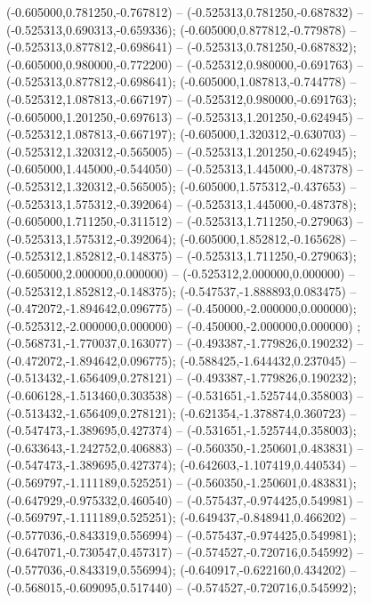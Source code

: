  (-0.605000,0.781250,-0.767812) -- (-0.525313,0.781250,-0.687832) -- (-0.525313,0.690313,-0.659336);
 (-0.605000,0.877812,-0.779878) -- (-0.525313,0.877812,-0.698641) -- (-0.525313,0.781250,-0.687832);
 (-0.605000,0.980000,-0.772200) -- (-0.525312,0.980000,-0.691763) -- (-0.525313,0.877812,-0.698641);
 (-0.605000,1.087813,-0.744778) -- (-0.525312,1.087813,-0.667197) -- (-0.525312,0.980000,-0.691763);
 (-0.605000,1.201250,-0.697613) -- (-0.525313,1.201250,-0.624945) -- (-0.525312,1.087813,-0.667197);
 (-0.605000,1.320312,-0.630703) -- (-0.525312,1.320312,-0.565005) -- (-0.525313,1.201250,-0.624945);
 (-0.605000,1.445000,-0.544050) -- (-0.525313,1.445000,-0.487378) -- (-0.525312,1.320312,-0.565005);
 (-0.605000,1.575312,-0.437653) -- (-0.525313,1.575312,-0.392064) -- (-0.525313,1.445000,-0.487378);
 (-0.605000,1.711250,-0.311512) -- (-0.525313,1.711250,-0.279063) -- (-0.525313,1.575312,-0.392064);
 (-0.605000,1.852812,-0.165628) -- (-0.525312,1.852812,-0.148375) -- (-0.525313,1.711250,-0.279063);
 (-0.605000,2.000000,0.000000) -- (-0.525312,2.000000,0.000000) -- (-0.525312,1.852812,-0.148375);
 (-0.547537,-1.888893,0.083475) -- (-0.472072,-1.894642,0.096775) -- (-0.450000,-2.000000,0.000000);
 (-0.525312,-2.000000,0.000000) -- (-0.450000,-2.000000,0.000000) ;
 (-0.568731,-1.770037,0.163077) -- (-0.493387,-1.779826,0.190232) -- (-0.472072,-1.894642,0.096775);
 (-0.588425,-1.644432,0.237045) -- (-0.513432,-1.656409,0.278121) -- (-0.493387,-1.779826,0.190232);
 (-0.606128,-1.513460,0.303538) -- (-0.531651,-1.525744,0.358003) -- (-0.513432,-1.656409,0.278121);
 (-0.621354,-1.378874,0.360723) -- (-0.547473,-1.389695,0.427374) -- (-0.531651,-1.525744,0.358003);
 (-0.633643,-1.242752,0.406883) -- (-0.560350,-1.250601,0.483831) -- (-0.547473,-1.389695,0.427374);
 (-0.642603,-1.107419,0.440534) -- (-0.569797,-1.111189,0.525251) -- (-0.560350,-1.250601,0.483831);
 (-0.647929,-0.975332,0.460540) -- (-0.575437,-0.974425,0.549981) -- (-0.569797,-1.111189,0.525251);
 (-0.649437,-0.848941,0.466202) -- (-0.577036,-0.843319,0.556994) -- (-0.575437,-0.974425,0.549981);
 (-0.647071,-0.730547,0.457317) -- (-0.574527,-0.720716,0.545992) -- (-0.577036,-0.843319,0.556994);
 (-0.640917,-0.622160,0.434202) -- (-0.568015,-0.609095,0.517440) -- (-0.574527,-0.720716,0.545992);
